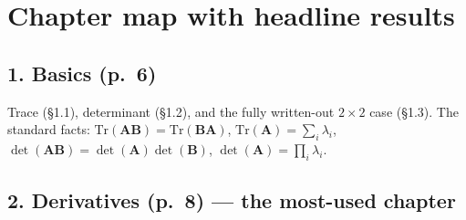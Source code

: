 \documentclass[10pt,a4paper]{article}
\begin{document}
\section{Chapter map with headline results}

\subsection{1. Basics (p.~6)}
Trace (\S1.1), determinant (\S1.2), and the fully written-out $2\times2$ case
(\S1.3).  The standard facts: $\mathrm{Tr}(\mathbf{AB})=\mathrm{Tr}(\mathbf{BA})$,
$\mathrm{Tr}(\mathbf{A})=\sum_{i}\lambda_{i}$,
$\det(\mathbf{AB})=\det(\mathbf{A})\det(\mathbf{B})$,
$\det(\mathbf{A})=\prod_{i}\lambda_{i}$.

\subsection{2. Derivatives (p.~8) --- the most-used chapter}
\end{document}
